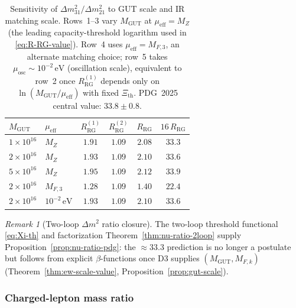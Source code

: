 \documentclass[aps,prd,onecolumn,amsmath,amssymb,nofootinbib,11pt]{revtex4-2}
\numberwithin{equation}{section}
\theoremstyle{plain}
\theoremstyle{definition}
\theoremstyle{remark}
\newtheorem{remark}[theorem]{Remark}
\begin{document}
\begin{table}[ht]
\centering
\small
\renewcommand{\arraystretch}{1.1}
\begin{tabular}{@{}llcccc@{}}
\toprule
$M_{\mathrm{GUT}}$ &
$\mu_{\mathrm{eff}}$ &
$R_{\mathrm{RG}}^{(1)}$ &
$R_{\mathrm{RG}}^{(2)}$ &
$R_{\mathrm{RG}}$ &
$16\,R_{\mathrm{RG}}$ \\
\midrule
$1\times 10^{16}$ & $M_Z$ & $1.91$ & $1.09$ & $2.08$ & $33.3$ \\
$2\times 10^{16}$ & $M_Z$ & $1.93$ & $1.09$ & $2.10$ & $33.6$ \\
$5\times 10^{16}$ & $M_Z$ & $1.95$ & $1.09$ & $2.12$ & $33.9$ \\
$2\times 10^{16}$ & $M_{F,3}$ & $1.28$ & $1.09$ & $1.40$ & $22.4$ \\
$2\times 10^{16}$ & $10^{-2}\,\mathrm{eV}$ & $1.93$ & $1.09$ & $2.10$ & $33.6$ \\
\bottomrule
\end{tabular}
\caption{Sensitivity of $\Delta m^2_{31}/\Delta m^2_{21}$ to GUT scale and IR
matching scale. Rows~1--3 vary $M_{\mathrm{GUT}}$ at $\mu_{\mathrm{eff}}=M_Z$
(the leading capacity-threshold logarithm used in \eqref{eq:R-RG-value}).
Row~4 uses $\mu_{\mathrm{eff}}=M_{F,3}$, an alternate matching choice;
row~5 takes $\mu_{\mathrm{osc}}\sim 10^{-2}\,\mathrm{eV}$
(oscillation scale), equivalent to row~2 once $R_{\mathrm{RG}}^{(1)}$ depends
only on $\ln(M_{\mathrm{GUT}}/\mu_{\mathrm{eff}})$ with fixed
$\Xi_{\mathrm{th}}$. PDG~2025 central value: $33.8\pm 0.8$.}
\label{tab:nu-ratio-sensitivity}
\end{table}

\begin{remark}[Two-loop $\Delta m^2$ ratio closure]
The two-loop threshold functional \eqref{eq:Xi-th} and factorization
Theorem~\ref{thm:nu-ratio-2loop} supply Proposition~\ref{prop:nu-ratio-pdg}:
the $\approx 33.3$ prediction is no longer a postulate but follows from
explicit $\beta$-functions once D3 supplies $(M_{\mathrm{GUT}},M_{F,k})$
(Theorem~\ref{thm:ew-scale-value}, Proposition~\ref{prop:gut-scale}).
\end{remark}

\subsubsection{Charged-lepton mass ratio}
\end{document}
